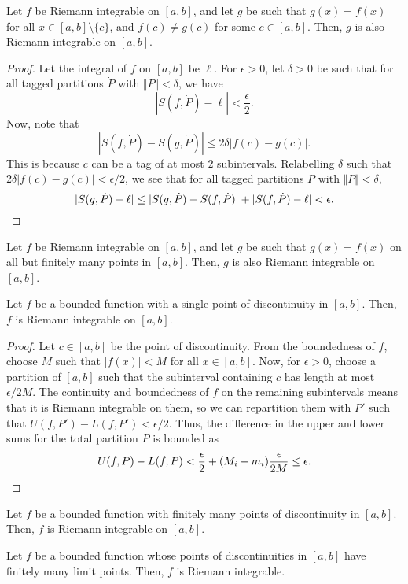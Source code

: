 \documentclass[11pt]{article}
\theoremstyle{definition}
\theoremstyle{remark}
\numberwithin{equation}{module}
\begin{document}
    \begin{theorem}
        Let $f$ be Riemann integrable on $[a, b]$, and let $g$ be such that $g(x) =
        f(x)$ for all $x \in [a, b]\setminus\{c\}$, and $f(c) \neq g(c)$ for some $c
        \in [a, b]$. Then, $g$ is also Riemann integrable on $[a, b]$.
    \end{theorem}
    \begin{proof}
        Let the integral of $f$ on $[a, b]$ be $\ell$. For $\epsilon > 0$, let
        $\delta > 0$ be such that for all tagged partitions $\dot{P}$ with
        $\Vert\dot{P}\Vert < \delta$, we have \[
            |S(f, \dot{P}) - \ell| < \frac{\epsilon}{2}.
        \] Now, note that \[
            |S(f, \dot{P}) - S(g, \dot{P})| \leq 2\delta |f(c) - g(c)|.
        \] This is because $c$ can be a tag of at most $2$ subintervals. Relabelling
        $\delta$ such that $2\delta|f(c) - g(c)| < \epsilon / 2$, we see that for
        all tagged partitions $\dot{P}$ with $\Vert\dot{P}\Vert < \delta$, \[
            |S(g, \dot{P}) - \ell| \leq |S(g, \dot{P}) - S(f, \dot{P})| + |S(f,
            \dot{P}) - \ell| < \epsilon. \qedhere
        \] 
    \end{proof}
    \begin{corollary}
        Let $f$ be Riemann integrable on $[a, b]$, and let $g$ be such that $g(x) =
        f(x)$ on all but finitely many points in $[a, b]$. Then, $g$ is also Riemann
        integrable on $[a, b]$.
    \end{corollary}

    \begin{theorem}
        Let $f$ be a bounded function with a single point of discontinuity in $[a,
        b]$.  Then, $f$ is Riemann integrable on $[a, b]$.
    \end{theorem}
    \begin{proof}
        Let $c \in [a, b]$ be the point of discontinuity. From the boundedness of
        $f$, choose $M$ such that $|f(x)| < M$ for all $x \in [a, b]$. Now, for
        $\epsilon > 0$, choose a partition of $[a, b]$ such that the subinterval
        containing $c$ has length at most $\epsilon / 2M$. The continuity and
        boundedness of $f$ on the remaining subintervals means that it is Riemann
        integrable on them, so we can repartition them with $P'$ such that $U(f, P')
        - L(f, P') < \epsilon / 2$. Thus, the difference in the upper and lower sums
        for the total partition $P$ is bounded as \[
            U(f, P) - L(f, P) < \frac{\epsilon}{2} + (M_i - m_i)\frac{\epsilon}{2M}
            \leq \epsilon. \qedhere
        \] 
    \end{proof}
    \begin{corollary}
        Let $f$ be a bounded function with finitely many points of discontinuity in
        $[a, b]$. Then, $f$ is Riemann integrable on $[a, b]$.
    \end{corollary}
    \begin{corollary}
        Let $f$ be a bounded function whose points of discontinuities in $[a, b]$
        have finitely many limit points. Then, $f$ is Riemann integrable.
    \end{corollary}
\end{document}
